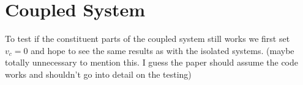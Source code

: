 \section{Coupled System}

\color{blue}
To test if the constituent parts of the coupled system still works we first set $v_c = 0$ and hope to see the same results as with the isolated systems. (maybe totally unnecessary to mention this. I guess the paper should assume the code works and shouldn't go into detail on the testing)
\color{black}
